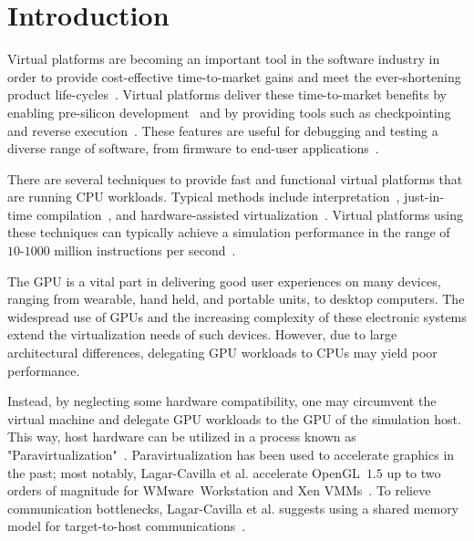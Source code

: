 \section{Introduction}
\label{sec:introduction}
Virtual platforms are becoming an important tool in the software industry in order to provide cost-effective time-to-market gains and meet the ever-shortening product life-cycles~.
Virtual platforms deliver these time-to-market benefits by enabling pre-silicon development~ and by providing tools such as checkpointing and reverse execution~.
These features are useful for debugging and testing a diverse range of software, from firmware to end-user applications~.

There are several techniques to provide fast and functional virtual platforms that are running CPU workloads.
Typical methods include interpretation~, just-in-time compilation~, and hardware-assisted virtualization~.
Virtual platforms using these techniques can typically achieve a simulation performance in the range of $10$-$1000$ million instructions per second~.

The GPU is a vital part in delivering good user experiences on many devices, ranging from wearable, hand held, and portable units, to desktop computers.
The widespread use of GPUs and the increasing complexity of these electronic systems extend the virtualization needs of such devices.
However, due to large architectural differences, delegating GPU workloads to CPUs may yield poor performance.

Instead, by neglecting some hardware compatibility, one may circumvent the virtual machine and delegate GPU workloads to the GPU of the simulation host.
This way, host hardware can be utilized in a process known as "Paravirtualization"~.
Paravirtualization has been used to accelerate graphics in the past; most notably, Lagar-Cavilla et al. accelerate OpenGL~$1.5$ up to two orders of magnitude for WMware~Workstation and Xen VMMs~.
To relieve communication bottlenecks, Lagar-Cavilla et al. suggests using a shared memory model for target-to-host communications~.

